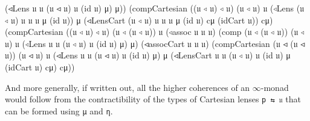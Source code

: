 \documentclass[
  11pt,
  oneside,
  article]{memoir}
\newenvironment{Shaded}{}{}
\newcommand{\NormalTok}[1]{#1}
\newcommand{\OtherTok}[1]{\textcolor[rgb]{0.00,0.44,0.13}{#1}}
\theoremstyle{definition}
\theoremstyle{plain}
\newcommand{\0}{\textsf{0}}
\newcommand{\1}{\tn{\textsf{1}}}
\begin{document}
\begin{Shaded}
\begin{Highlighting}[]
                    \OtherTok{(}\NormalTok{◃Lens 𝔲 𝔲 }\OtherTok{(}\NormalTok{𝔲 ◃ 𝔲}\OtherTok{)}\NormalTok{ 𝔲 }\OtherTok{(}\NormalTok{id 𝔲}\OtherTok{)}\NormalTok{ μ}\OtherTok{)}\NormalTok{ μ}\OtherTok{))} 
        \OtherTok{(}\NormalTok{compCartesian }\OtherTok{((}\NormalTok{𝔲 ◃ 𝔲}\OtherTok{)}\NormalTok{ ◃ 𝔲}\OtherTok{)} \OtherTok{(}\NormalTok{𝔲 ◃ 𝔲}\OtherTok{)}\NormalTok{ 𝔲 }
                       \OtherTok{(}\NormalTok{◃Lens }\OtherTok{(}\NormalTok{𝔲 ◃ 𝔲}\OtherTok{)}\NormalTok{ 𝔲 𝔲 𝔲 μ }\OtherTok{(}\NormalTok{id 𝔲}\OtherTok{))}\NormalTok{ μ }
                       \OtherTok{(}\NormalTok{◃LensCart }\OtherTok{(}\NormalTok{𝔲 ◃ 𝔲}\OtherTok{)}\NormalTok{ 𝔲 𝔲 𝔲 μ }\OtherTok{(}\NormalTok{id 𝔲}\OtherTok{)} 
\NormalTok{                                  cμ }\OtherTok{(}\NormalTok{idCart 𝔲}\OtherTok{))}\NormalTok{ cμ}\OtherTok{)}
        \OtherTok{(}\NormalTok{compCartesian }\OtherTok{((}\NormalTok{𝔲 ◃ 𝔲}\OtherTok{)}\NormalTok{ ◃ 𝔲}\OtherTok{)} \OtherTok{(}\NormalTok{𝔲 ◃ }\OtherTok{(}\NormalTok{𝔲 ◃ 𝔲}\OtherTok{))}\NormalTok{ 𝔲 }
                       \OtherTok{(}\NormalTok{◃assoc 𝔲 𝔲 𝔲}\OtherTok{)} 
                       \OtherTok{(}\NormalTok{comp }\OtherTok{(}\NormalTok{𝔲 ◃ }\OtherTok{(}\NormalTok{𝔲 ◃ 𝔲}\OtherTok{))} \OtherTok{(}\NormalTok{𝔲 ◃ 𝔲}\OtherTok{)}\NormalTok{ 𝔲 }
                             \OtherTok{(}\NormalTok{◃Lens 𝔲 𝔲 }\OtherTok{(}\NormalTok{𝔲 ◃ 𝔲}\OtherTok{)}\NormalTok{ 𝔲 }
                                    \OtherTok{(}\NormalTok{id 𝔲}\OtherTok{)}\NormalTok{ μ}\OtherTok{)}\NormalTok{ μ}\OtherTok{)} 
                       \OtherTok{(}\NormalTok{◃assocCart 𝔲 𝔲 𝔲}\OtherTok{)}
                       \OtherTok{(}\NormalTok{compCartesian }
                          \OtherTok{(}\NormalTok{𝔲 ◃ }\OtherTok{(}\NormalTok{𝔲 ◃ 𝔲}\OtherTok{))} \OtherTok{(}\NormalTok{𝔲 ◃ 𝔲}\OtherTok{)}\NormalTok{ 𝔲 }
                          \OtherTok{(}\NormalTok{◃Lens 𝔲 𝔲 }\OtherTok{(}\NormalTok{𝔲 ◃ 𝔲}\OtherTok{)}\NormalTok{ 𝔲 }\OtherTok{(}\NormalTok{id 𝔲}\OtherTok{)}\NormalTok{ μ}\OtherTok{)}\NormalTok{ μ }
                          \OtherTok{(}\NormalTok{◃LensCart 𝔲 𝔲 }\OtherTok{(}\NormalTok{𝔲 ◃ 𝔲}\OtherTok{)}\NormalTok{ 𝔲 }\OtherTok{(}\NormalTok{id 𝔲}\OtherTok{)}\NormalTok{ μ }
                                     \OtherTok{(}\NormalTok{idCart 𝔲}\OtherTok{)}\NormalTok{ cμ}\OtherTok{)}\NormalTok{ cμ}\OtherTok{))}
\end{Highlighting}
\end{Shaded}

And more generally, if written out, all the higher coherences of an \(\infty\)-monad
would follow from the contractibility of the types of Cartesian lenses
\texttt{p\ ⇆\ 𝔲} that can be formed using \texttt{μ} and \texttt{η}.
\end{document}
